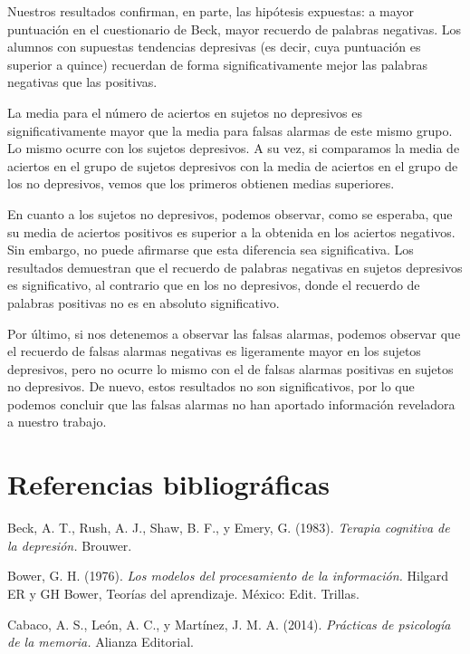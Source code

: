 \documentclass[a4paper,11pt]{article}
\begin{document}
Nuestros resultados confirman, en parte, las hipótesis expuestas: a mayor puntuación en el cuestionario  de Beck, mayor recuerdo de palabras negativas. Los alumnos con supuestas tendencias depresivas (es decir, cuya puntuación es superior a quince) recuerdan de forma significativamente mejor las palabras negativas que las positivas. 

La media para el número de aciertos en sujetos no depresivos es significativamente mayor que la media para falsas alarmas de este mismo grupo. Lo mismo ocurre con los sujetos depresivos. A su vez, si comparamos la media de aciertos en el grupo de sujetos depresivos con la media de aciertos en el grupo de los no depresivos, vemos que los primeros obtienen medias superiores.

En cuanto a los sujetos no depresivos, podemos observar, como se esperaba, que su media de aciertos positivos es superior a la obtenida en los aciertos negativos. Sin embargo, no puede afirmarse que esta diferencia sea significativa. Los resultados demuestran que el recuerdo de palabras negativas en sujetos depresivos es significativo, al contrario que en los no depresivos, donde el recuerdo de palabras positivas no es en absoluto significativo.

Por último, si nos detenemos a observar las falsas alarmas, podemos observar que el recuerdo de falsas alarmas negativas es ligeramente mayor en los sujetos depresivos, pero no ocurre lo mismo con el de falsas alarmas positivas en sujetos no depresivos. De nuevo, estos resultados no son significativos, por lo que podemos concluir que las falsas alarmas no han aportado información reveladora a nuestro trabajo.

\newpage

\section{Referencias bibliográficas}
\indent

\leftskip 0.3in
\parindent -0.3in

Beck, A. T., Rush, A. J., Shaw, B. F., y Emery, G. (1983). \textit{Terapia cognitiva de la depresión.} Brouwer.

Bower, G. H. (1976). \textit{Los modelos del procesamiento de la información.} Hilgard ER y GH Bower, Teorías del aprendizaje. México: Edit. Trillas.

Cabaco, A. S., León, A. C., y Martínez, J. M. A. (2014). \textit{Prácticas de psicología de la memoria.} Alianza Editorial.
\end{document}
